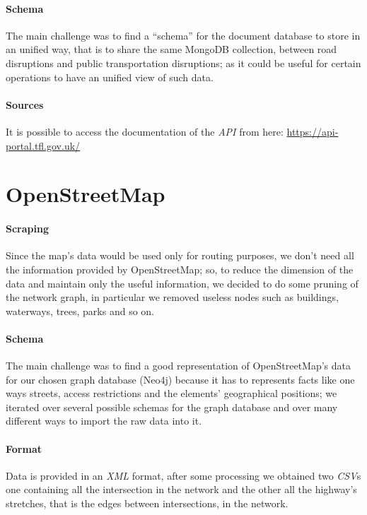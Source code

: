 \paragraph{Schema}
The main challenge was to find a ``schema'' for the document database to store 
in 
an unified way, that is to share the same MongoDB collection, between road 
disruptions and public transportation disruptions; as it could be useful for 
certain operations to have an unified view of such data.

\paragraph{Sources}
It is possible to access the documentation of the \textit{API} from here: 
\url{https://api-portal.tfl.gov.uk/}

\section{OpenStreetMap}

\paragraph{Scraping}
Since the map’s data would be used only for routing purposes, we don’t need all 
the information provided by OpenStreetMap; so, to reduce the dimension of the 
data and maintain only the useful information, we decided to do some pruning of 
the network graph, in particular we removed useless nodes such as buildings, 
waterways, trees, parks and so on.

\paragraph{Schema}
The main challenge was to find a good representation of OpenStreetMap’s data 
for our chosen graph database (Neo4j) because it has to represents facts like 
one ways streets, access restrictions and the elements' geographical positions; 
we iterated over several possible schemas for the graph database and over many 
different ways to import the raw data into it.

\paragraph{Format}
Data is provided in an \textit{XML} format, after some processing we obtained 
two \textit{CSV}s one containing all the intersection in the network and the 
other all the highway's stretches, that is the edges between intersections, in 
the network.

